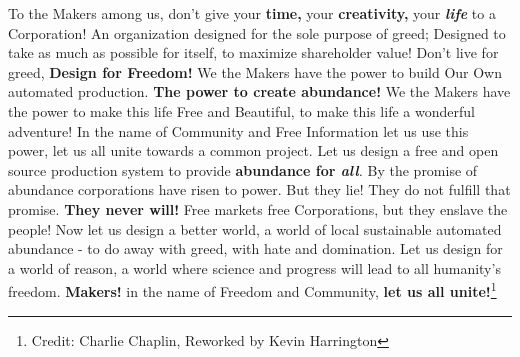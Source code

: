 \documentclass{article}
\begin{document}
{To the Makers among us, don't give your \textbf{time,} your
\textbf{creativity,} your \emph{\textbf{life}} to a Corporation! An
organization designed for the sole purpose of greed; Designed to take as
much as possible for itself, to maximize shareholder value! Don't live
for greed, \textbf{Design for Freedom!} We the Makers have the power to
build Our Own automated production. \textbf{The power to create abundance!} We the Makers have the power to make this life Free and
Beautiful, to make this life a wonderful adventure! In the name of
Community and Free Information let us use this power, let us all unite
towards a common project. Let us design a free and open source
production system to provide \textbf{abundance for \emph{all}}\emph{.}
By the promise of abundance corporations have risen to power. But they
lie! They do not fulfill that promise. \textbf{They never will!} Free
markets free Corporations, but they enslave the people! Now let us
design a better world, a world of local sustainable automated abundance
- to do away with greed, with hate and domination. Let us design for a
world of reason, a world where science and progress will lead to all
humanity's freedom. \textbf{Makers!} in the name of Freedom and
Community, \textbf{let us all unite!}\footnote{Credit: Charlie Chaplin, Reworked by Kevin Harrington}

}
\end{document}
